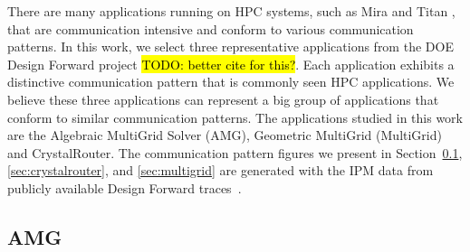 \documentclass[conference]{IEEEtran}
\newcommand{\TODO}[1]{\hl{TODO: #1}}
\begin{document}
There are many applications running on HPC systems, such as Mira \cite{bgq} and Titan \cite{titan}, that are communication intensive and conform to various communication patterns. In this work, we select three representative applications from the DOE Design Forward project \cite{designforwardwebpage} \TODO{better cite for this?}. Each application exhibits a distinctive communication pattern that is commonly seen HPC applications. We believe these three applications can represent a big group of applications that conform to similar communication patterns. The applications studied in this work are the Algebraic MultiGrid Solver (AMG), Geometric MultiGrid (MultiGrid) and CrystalRouter. The communication pattern figures we present in Section~\ref{sec:amg}, \ref{sec:crystalrouter}, and \ref{sec:multigrid} are generated with the IPM \cite{ipm} data from publicly available Design Forward traces~\cite{designforwardwebpage}.



\subsection{AMG}
\label{sec:amg}
\end{document}
